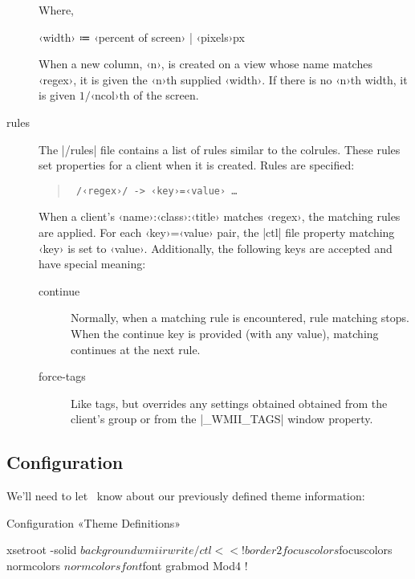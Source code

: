 \begin{description}
        Where,

        \begin{code}
    ‹width› ≔ ‹percent of screen› | ‹pixels›px
        \end{code}

        When a new column, ‹n›, is created on a view whose name
        matches ‹regex›, it is given the ‹n›th supplied ‹width›.
        If there is no ‹n›th width, it is given
        $1/\mbox{‹ncol›th}$ of the screen.

  \item[rules]
    The |/rules| file contains a list of
    rules similar to the colrules. These rules set
    properties for a client when it is created.
    Rules are specified:

    \begin{quote}\texttt{
      /‹regex›/ -> ‹key›{\color{gray}=}‹value› {\color{gray}\ldots}}
    \end{quote}

    When a client's ‹name›:‹class›:‹title› matches
    ‹regex›, the matching rules are applied. For each
    ‹key›=‹value› pair, the |ctl| file property matching
    ‹key› is set to ‹value›.  Additionally,  the  following
    keys are accepted and have special meaning:

    \begin{description}
      \item[continue]
        Normally, when a matching rule  is  encountered,
        rule  matching  stops.  When the continue key is
        provided (with any value), matching continues at
        the next rule.
      \item[force-tags]
        Like  tags,  but overrides any settings obtained
        obtained from the client's  group  or  from  the
        |_WMII_TAGS| window property.
    \end{description}

\end{description}


\subsection{Configuration}

We'll need to let \wmii\ know about our previously defined theme
information:

\begin{Fragment}{Configuration}
  «Theme Definitions»

  xsetroot -solid $background
  wmiir write /ctl <<!
  border 2
  focuscolors $focuscolors
  normcolors $normcolors
  font $font
  grabmod Mod4
  !
\end{Fragment}

